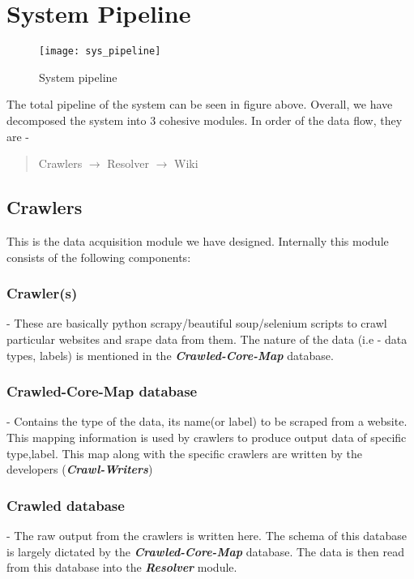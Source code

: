 \chapter{System Pipeline}

\begin{figure}[here]
\begin{center}	
\texttt{[image: sys\_pipeline]} 
\caption{System pipeline}
\label{fig:sys_pipeline}
\end{center}
\end{figure}
The total pipeline of the system can be seen in figure above. Overall, we have decomposed the system into 3 cohesive modules. In order of the data flow, they are - 
\begin{quotation}
Crawlers $\rightarrow$ Resolver $\rightarrow$ Wiki
\end{quotation}

\section{Crawlers}
This is the data acquisition module we have designed. Internally this module consists of the following components:

\subsection{\textbf{Crawler(s)}} - These are basically python scrapy/beautiful soup/selenium scripts to crawl particular websites and srape data from them. The nature of the data (i.e - data types, labels) is mentioned in the \emph{\textbf{Crawled-Core-Map}} database.

\subsection{\textbf{Crawled-Core-Map database}} - Contains the type of the data, its name(or label) to be scraped from a website. This mapping information is used by crawlers to produce output data of specific type,label. This map along with the specific crawlers are written by the developers (\emph{\textbf{Crawl-Writers}})

\subsection{\textbf{Crawled database}} - The raw output from the crawlers is written here. The schema of this database is largely dictated by the \emph{\textbf{Crawled-Core-Map}} database. The data is then read from this database into the \emph{\textbf{Resolver}} module.

